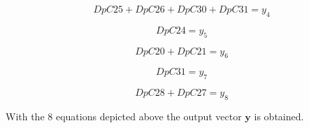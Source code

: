 \vspace{4mm}
\begin {equation}
    DpC25 + DpC26 + DpC30 + DpC31 = y_4
\end{equation}

\vspace{4mm}
\begin {equation}
    DpC24 = y_5
\end{equation}

\vspace{4mm}
\begin {equation}
    DpC20 + DpC21= y_6
\end{equation}

\vspace{4mm}
\begin {equation}
    DpC31 = y_7
\end{equation}

\vspace{4mm}
\begin {equation}
    DpC28 + DpC27 = y_8
\end{equation}


With the $8$ equations depicted above the output vector $\pmb{y}$ is obtained. 

